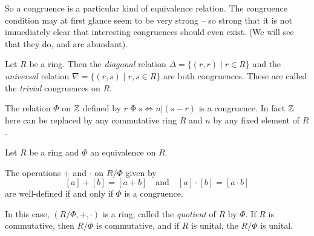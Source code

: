 So a congruence is a particular kind of equivalence relation.
The congruence condition may at first glance seem to be very strong -- so strong that it is not immediately clear that interesting congruences should even exist.
(We will see that they do, and are abundant).

\begin{examples}
\item Let \(R\) be a ring.
Then the \emph{diagonal} relation \(\Delta = \{ (r,r) \mid r \in R \}\) and the \emph{universal} relation \(\nabla = \{ (r,s) \mid r,s \in R \}\) are both congruences.
These are called the \emph{trivial} congruences on \(R\).

\item The relation \(\Phi\) on \(\mathbb{Z}\) defined by \(r \mathrel{\Phi} s \Leftrightarrow n|(s-r)\) is a congruence.
In fact \(\mathbb{Z}\) here can be replaced by any commutative ring \(R\) and \(n\) by any fixed element of \(R\).
\end{examples}

\begin{prop}
Let \(R\) be a ring and \(\Phi\) an equivalence on \(R\).
\begin{proplist}
\item The operations \(+\) and \(\cdot\) on \(R/\Phi\) given by \[ [a] + [b] = [a+b] \quad \mathrm{and} \quad [a] \cdot [b] = [a \cdot b] \] are well-defined if and only if \(\Phi\) is a congruence.
\item In this case, \((R/\Phi, +, \cdot)\) is a ring, called the \emph{quotient} of \(R\) by \(\Phi\).
If \(R\) is commutative, then \(R/\Phi\) is commutative, and if \(R\) is unital, the \(R/\Phi\) is unital.
\end{proplist}
\end{prop}

